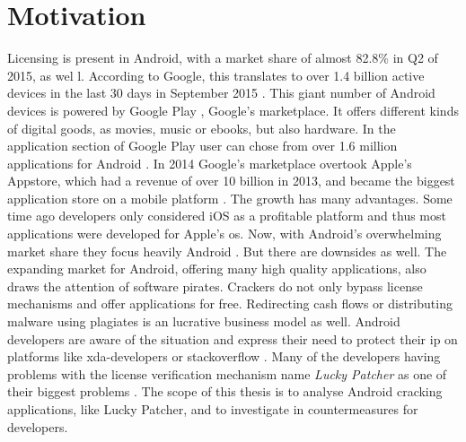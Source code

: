 \section{Motivation} \label{subsection:introduction-motivation}
Licensing is present in Android, with a market share of almost 82.8\% in Q2 of 2015,  as wel \cite{androidShare}l.
According to Google, this translates to over 1.4 billion active devices in the last 30 days in September 2015 \cite{androidDevices}.
This giant number of Android devices is powered by Google Play \cite{googlePlay}, Google's marketplace.
It offers different kinds of digital goods, as movies, music or ebooks, but also hardware.
In the application section of Google Play user can chose from over 1.6 million applications for Android \cite{statistaAppStore}.
In 2014 Google's marketplace overtook Apple's Appstore, which had a revenue of over 10 billion in 2013, and became the biggest application store on a mobile platform \cite{wiwoValue}.
\newline
The growth has many advantages.
Some time ago developers only considered iOS as a profitable platform and thus most applications were developed for Apple's \gls{os}.
Now, with Android's overwhelming market share they focus heavily Android \cite{businessProfit}.
But there are downsides as well.
The expanding market for Android, offering many high quality applications, also draws the attention of software pirates.
Crackers do not only bypass license mechanisms and offer applications for free.
Redirecting cash flows or distributing malware using plagiates is an lucrative business model as well.
Android developers are aware of the situation \cite{developersPiracy} and express their need to protect their \gls{ip} on platforms like xda-developers \cite{xdaPiracy} or stackoverflow \cite{stackoverflowPiracy}.
Many of the developers having problems with the license verification mechanism name \textit{Lucky Patcher} as one of their biggest problems \cite{stackoverflowLucky}.
\newline
\newline
The scope of this thesis is to analyse Android cracking applications, like Lucky Patcher,  and to investigate in countermeasures for developers.

